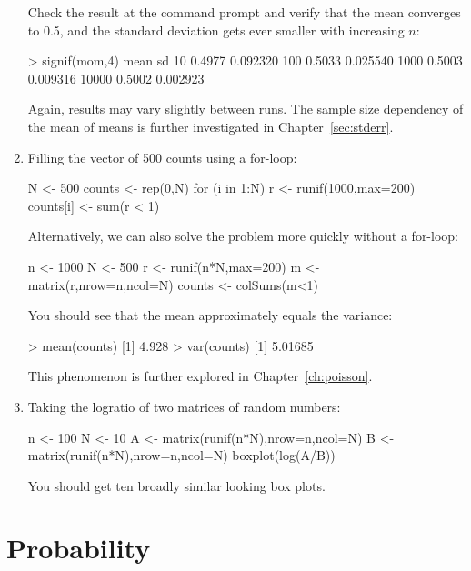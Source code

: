 \begin{enumerate}
Check the result at the command prompt and verify that the mean
converges to 0.5, and the standard deviation gets ever smaller with
increasing $n$:

\begin{console}
> signif(mom,4)
        mean       sd
10    0.4977 0.092320
100   0.5033 0.025540
1000  0.5003 0.009316
10000 0.5002 0.002923
\end{console}
  
Again, results may vary slightly between runs. The sample size
dependency of the mean of means is further investigated in
Chapter~\ref{sec:stderr}.

\item Filling the vector of 500 counts using a for-loop:

\begin{script}
N <- 500
counts <- rep(0,N)
for (i in 1:N){
  r <- runif(1000,max=200)
  counts[i] <- sum(r < 1)
}
\end{script}

Alternatively, we can also solve the problem more quickly without a
for-loop:

\begin{script}
n <- 1000
N <- 500
r <- runif(n*N,max=200)
m <- matrix(r,nrow=n,ncol=N)
counts <- colSums(m<1)
\end{script}

You should see that the mean approximately equals the variance:

\begin{console}
> mean(counts)
[1] 4.928
> var(counts)
[1] 5.01685
\end{console}

This phenomenon is further explored in Chapter~\ref{ch:poisson}.

\item Taking the logratio of two matrices of random numbers:

\begin{script}
n <- 100
N <- 10
A <- matrix(runif(n*N),nrow=n,ncol=N)
B <- matrix(runif(n*N),nrow=n,ncol=N)
boxplot(log(A/B))
\end{script}

You should get ten broadly similar looking box plots.

\end{enumerate}

\section{Probability}
\label{sec:sol-probability}

